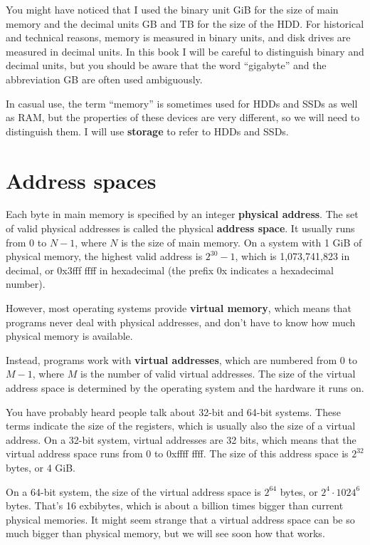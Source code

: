 \documentclass[12pt]{book}
\begin{document}
{You might have noticed that I used the binary unit
GiB for the size of main memory and the decimal units GB and TB for
the size of the HDD.  For historical and technical reasons, memory is
measured in binary units, and disk drives are measured in decimal
units.  In this book I will be careful to distinguish binary and
decimal units, but you should be aware that the word ``gigabyte'' and the
abbreviation GB are often used ambiguously.

In casual use, the term ``memory'' is sometimes used for HDDs and SSDs
as well as RAM, but the properties of these devices are very
different, so we will need to distinguish them.  I will use
{\bf storage} to refer to HDDs and SSDs.


\section{Address spaces}

Each byte in main memory is specified by an integer {\bf physical
address}.  The set of valid physical addresses is called the
physical {\bf address space}.  It
usually runs from 0 to $N-1$, where $N$ is
the size of main memory.  On a system with 1 GiB of physical memory,
the highest valid address is $2^{30}-1$, which is 1,073,741,823 in
decimal, or 0x3fff ffff in hexadecimal (the prefix 0x indicates a
hexadecimal number).

However, most operating systems provide {\bf virtual memory}, which
means that programs never deal with physical addresses, and don't 
have to know how much physical memory is available.

Instead, programs work with {\bf virtual addresses}, which are numbered
from 0 to $M-1$, where $M$ is the number of valid virtual addresses.
The size of the virtual address space is determined by the operating
system and the hardware it runs on.

You have probably heard people talk about 32-bit and 64-bit systems.
These terms indicate the size of the registers, which is usually also
the size of a virtual address.  On a 32-bit system, virtual addresses
are 32 bits, which means that the virtual address space runs from 0 to
0xffff ffff.  The size of this address space is $2^{32}$ bytes, or 4
GiB.

On a 64-bit system, the size of the virtual address space is $2^{64}$
bytes, or $2^4 \cdot 1024^6$ bytes.  That's 16 exbibytes, which is
about a billion times bigger than current physical memories.  It might
seem strange that a virtual address space can be so much bigger
than physical memory, but we will see soon how that works.

}
\end{document}
